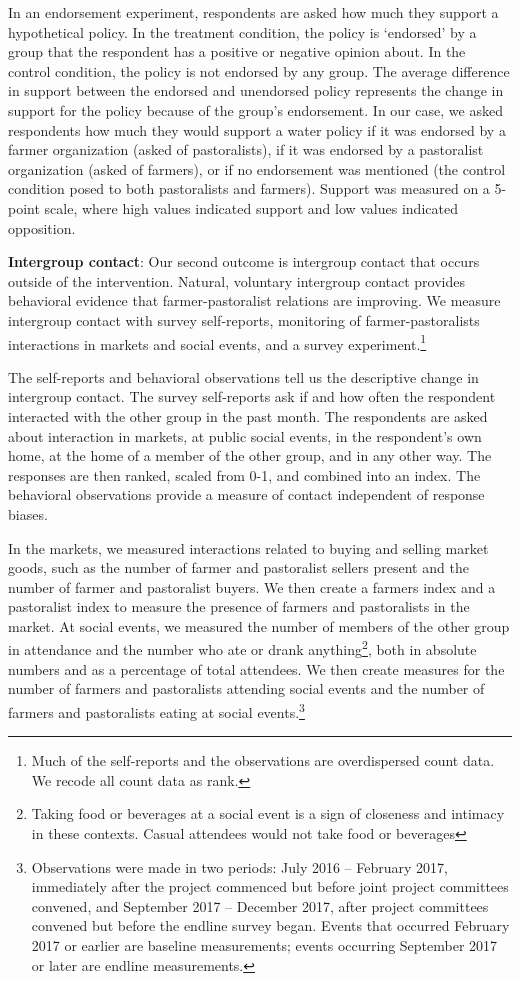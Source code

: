 \documentclass[11pt]{article}
\begin{document}
In an endorsement experiment, respondents are asked how much they
support a hypothetical policy. In the treatment condition, the policy is
`endorsed' by a group that the respondent has a positive or negative
opinion about. In the control condition, the policy is not endorsed by
any group. The average difference in support between the endorsed and
unendorsed policy represents the change in support for the policy
because of the group's endorsement. In our case, we asked respondents
how much they would support a water policy if it was endorsed by a
farmer organization (asked of pastoralists), if it was endorsed by a
pastoralist organization (asked of farmers), or if no endorsement was
mentioned (the control condition posed to both pastoralists and
farmers). Support was measured on a 5-point scale, where high values
indicated support and low values indicated opposition.

\textbf{Intergroup contact}: Our second outcome is intergroup contact
that occurs outside of the intervention. Natural, voluntary intergroup
contact provides behavioral evidence that farmer-pastoralist relations
are improving. We measure intergroup contact with survey self-reports,
monitoring of farmer-pastoralists interactions in markets and social
events, and a survey experiment.\footnote{Much of the self-reports and
  the observations are overdispersed count data. We recode all count
  data as rank.}

The self-reports and behavioral observations tell us the descriptive
change in intergroup contact. The survey self-reports ask if and how
often the respondent interacted with the other group in the past month.
The respondents are asked about interaction in markets, at public social
events, in the respondent's own home, at the home of a member of the
other group, and in any other way. The responses are then ranked, scaled
from 0-1, and combined into an index. The behavioral observations
provide a measure of contact independent of response biases.

In the markets, we measured interactions related to buying and selling
market goods, such as the number of farmer and pastoralist sellers
present and the number of farmer and pastoralist buyers. We then create
a farmers index and a pastoralist index to measure the presence of
farmers and pastoralists in the market. At social events, we measured
the number of members of the other group in attendance and the number
who ate or drank anything\footnote{Taking food or beverages at a social
  event is a sign of closeness and intimacy in these contexts. Casual
  attendees would not take food or beverages}, both in absolute numbers
and as a percentage of total attendees. We then create measures for the
number of farmers and pastoralists attending social events and the
number of farmers and pastoralists eating at social events.\footnote{Observations
  were made in two periods: July 2016 -- February 2017, immediately
  after the project commenced but before joint project committees
  convened, and September 2017 -- December 2017, after project
  committees convened but before the endline survey began. Events that
  occurred February 2017 or earlier are baseline measurements; events
  occurring September 2017 or later are endline measurements.}
\end{document}
